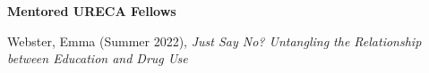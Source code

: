\begin{comment}
{\large\textbf{Undergraduate Honors Thesis Committee Member}}
\begin{etaremune}
\item Qian, Tom (Apr 2016), \textit{Appraisal Structure Universality}. Vanderbilt%
%
\item Sparks, Sloane (Apr 2014), \textit{Gender Differences in Emotional Intelligence: Positive Emotions \& Appraisal Theory}. Vanderbilt%
\item Fuller, Lydia (Apr 2014), \textit{GED Student Achievement Trajectories and Predictors: Using the Latent Class Growth Model to Understand Heterogeneous Learning Patterns}. Vanderbilt%
\end{etaremune}
\end{comment}
{\large\textbf{Mentored URECA Fellows}}
\begin{etaremune}%
\item Webster, Emma (Summer 2022), \textit{Just Say No? Untangling the Relationship between Education and Drug Use}%
\end{etaremune}%
